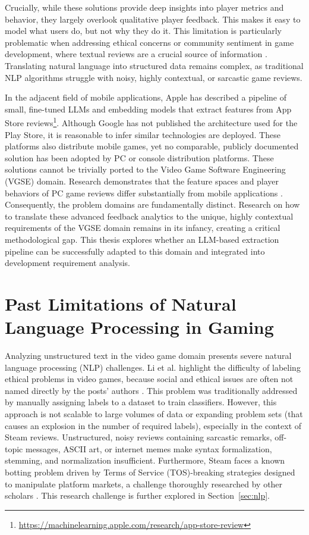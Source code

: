 Crucially, while these solutions provide deep insights into player metrics and behavior, they largely overlook qualitative player feedback. This makes it easy to model what users do, but not why they do it. This limitation is particularly problematic when addressing ethical concerns or community sentiment in game development, where textual reviews are a crucial source of information \cite{ethical_game_dev_reddit}. Translating natural language into structured data remains complex, as traditional NLP algorithms struggle with noisy, highly contextual, or sarcastic game reviews.

In the adjacent field of mobile applications, Apple has described a pipeline of small, fine-tuned LLMs and embedding models that extract features from App Store reviews\footnote{\url{https://machinelearning.apple.com/research/app-store-review}}. Although Google has not published the architecture used for the Play Store, it is reasonable to infer similar technologies are deployed. These platforms also distribute mobile games, yet no comparable, publicly documented solution has been adopted by PC or console distribution platforms. These solutions cannot be trivially ported to the Video Game Software Engineering (VGSE) domain. Research demonstrates that the feature spaces and player behaviors of PC game reviews differ substantially from mobile applications \cite{steam_vs_mobile}. Consequently, the problem domains are fundamentally distinct. Research on how to translate these advanced feedback analytics to the unique, highly contextual requirements of the VGSE domain remains in its infancy, creating a critical methodological gap. This thesis explores whether an LLM-based extraction pipeline can be successfully adapted to this domain and integrated into development requirement analysis.

\section{Past Limitations of Natural Language Processing in Gaming}
\label{sec:past_limitations}
\noindent Analyzing unstructured text in the video game domain presents severe natural language processing (NLP) challenges. Li et al. highlight the difficulty of labeling ethical problems in video games, because social and ethical issues are often not named directly by the posts' authors \cite{ethical_game_dev_reddit}. This problem was traditionally addressed by manually assigning labels to a dataset to train classifiers. However, this approach is not scalable to large volumes of data or expanding problem sets (that causes an explosion in the number of required labels), especially in the context of Steam reviews. Unstructured, noisy reviews containing sarcastic remarks, off-topic messages, ASCII art, or internet memes make syntax formalization, stemming, and normalization insufficient. Furthermore, Steam faces a known botting problem driven by Terms of Service (TOS)-breaking strategies designed to manipulate platform markets, a challenge thoroughly researched by other scholars \cite{steam_bot_detection}. This research challenge is further explored in Section~\ref{sec:nlp}.

